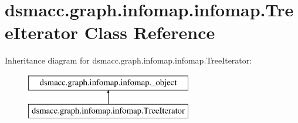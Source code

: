 \hypertarget{classdsmacc_1_1graph_1_1infomap_1_1infomap_1_1TreeIterator}{}\section{dsmacc.\+graph.\+infomap.\+infomap.\+Tree\+Iterator Class Reference}
\label{classdsmacc_1_1graph_1_1infomap_1_1infomap_1_1TreeIterator}
Inheritance diagram for dsmacc.\+graph.\+infomap.\+infomap.\+Tree\+Iterator\+:\begin{figure}[H]
\begin{center}
\leavevmode
\includegraphics[height=2.000000cm]{classdsmacc_1_1graph_1_1infomap_1_1infomap_1_1TreeIterator}
\end{center}
\end{figure}
